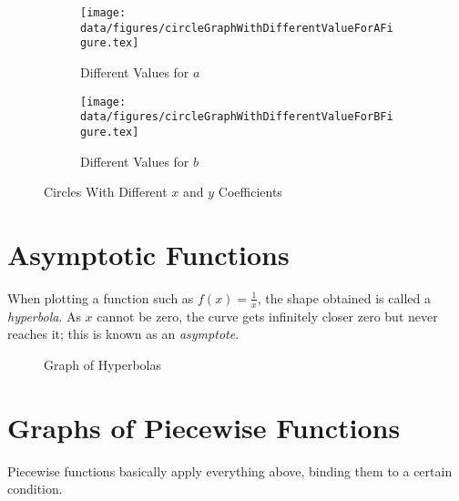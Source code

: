 \documentclass[a5paper,9pt]{book}
\theoremstyle{definition}
\begin{document}
        \begin{figure}[ht]
          \centering
          \begin{subfigure}{0.45\textwidth}
            \centering
            \texttt{[image: data/figures/circleGraphWithDifferentValueForAFigure.tex]}
            \caption{Different Values for $a$}
          \end{subfigure}
          \begin{subfigure}{0.45\textwidth}
            \centering
            \texttt{[image: data/figures/circleGraphWithDifferentValueForBFigure.tex]}
            \caption{Different Values for $b$}
          \end{subfigure}
          \caption{Circles With Different $x$ and $y$ Coefficients}
        \end{figure}

        \section{Asymptotic Functions}

        When plotting a function such as $f(x)=\frac{1}{x}$, the shape obtained is called
        a \emph{hyperbola}. As $x$ cannot be zero, the curve gets infinitely closer
        zero but never reaches it; this is known as an \emph{asymptote}.

        \begin{figure}[ht!]
            \centering
            
            \caption{Graph of Hyperbolas}\label{fig:graph_of_hyperbolas}
        \end{figure}


        \pagebreak

        \section{Graphs of Piecewise Functions}

        Piecewise functions basically apply everything above, binding them to a certain condition.

\end{document}

